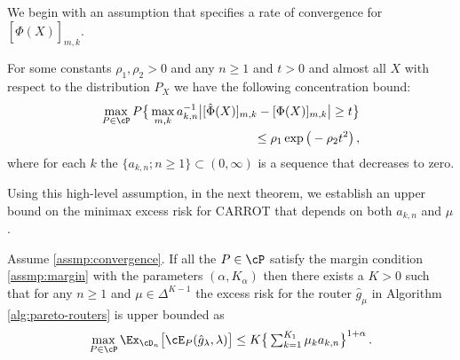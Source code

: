 We begin with an assumption that specifies a rate of convergence for $[\hat \Phi(X)]_{m, k}$. 
\begin{assumption} \label{assmp:convergence}
    For some constants $\rho_1, \rho_2 > 0$ and any $n \ge 1$ and $t > 0$ and almost all $X$ with respect to the distribution $P_X$ we have the following concentration bound:
    \begin{align}\label{eq:concentration-phi}
        \max_{P\in \cP} P \big \{ \max_{m, k} a_{k, n}^{-1}\big |[\hat \Phi (X)]_{m, k} - [\Phi  (X)]_{m, k}\big |
        \ge t\big \} \nonumber \\
        \le  \rho_1 \exp\big (- \rho_2  t^2 \big )\,,  
    \end{align}  where for each $k$ the  $\{a_{k,n}; n \ge 1\}\subset (0, \infty)$ is a sequence that decreases to zero. 
\end{assumption}
Using this high-level assumption, in the next theorem, we establish an upper bound on the minimax excess risk for CARROT that depends on both $a_{k, n}$ and $\mu$.  
\begin{theorem}\label{thm:upper-bound}
  Assume \ref{assmp:convergence}.   If all the $P\in \cP$ satisfy the margin condition \ref{assmp:margin} with the parameters $(\alpha, K_\alpha)$ then there exists a $K> 0$ such that for any $n \ge 1$ and $\mu\in \Delta^{K-1} $ the excess risk for the router $\hat g_\mu$ in Algorithm \ref{alg:pareto-routers} is upper bounded as 
    \begin{equation}
        \max_{P\in \cP} \Ex_{\cD_n}\big [\cE_P(\hat g_\lambda,\lambda)\big ] \le\textstyle K \big \{\sum_{k = 1}^{K_1} \mu_k a_{k, n}\big\}^{1+\alpha} \,.
    \end{equation}
\end{theorem} 


